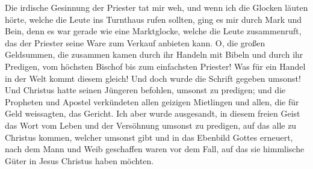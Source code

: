 Die irdische Gesinnung der Priester tat mir weh, und wenn
ich die Glocken läuten hörte, welche die Leute ins Turnthaus
rufen sollten, ging es mir durch Mark und Bein, denn es war
gerade wie eine Marktglocke, welche die Leute zusammenruft, das
der Priester seine Ware zum Verkauf anbieten kann. O, die
großen Geldsummen, die zusammen kamen durch ihr Handeln mit
Bibeln und durch ihr Predigen, vom höchsten Bischof bis zum
einfachsten Priester! Was für ein Handel in der Welt kommt
diesem gleich! Und doch wurde die Schrift gegeben umsonst! Und
Christus hatte seinen Jüngeren befohlen, umsonst zu predigen;
und die Propheten und Apostel verkündeten allen geizigen 
Mietlingen und allen, die für Geld 
weissagten, das Gericht. Ich
aber wurde ausgesandt, in diesem freien Geist das Wort vom
Leben und der Versöhnung umsonst zu predigen, auf das alle zu
Christus kommen, welcher umsonst gibt und in das Ebenbild
Gottes erneuert, nach dem Mann und Weib geschaffen waren
vor dem Fall, auf das sie himmlische Güter in Jesus Christus
haben möchten.